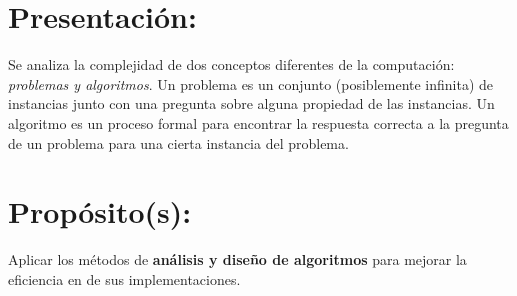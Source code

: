 \section{Presentaci\'{o}n:}

Se analiza la complejidad de dos conceptos diferentes de la
computaci\'{o}n: {\em problemas y algoritmos}. Un problema es un
conjunto (posiblemente infinita) de instancias junto con una pregunta
sobre alguna propiedad de las instancias.  Un algoritmo es un proceso
formal para encontrar la respuesta correcta a la pregunta de un
problema para una cierta instancia del problema.
  
\section{Prop\'{o}sito(s):}

Aplicar los m\'{e}todos de {\bf an\'{a}lisis y dise\~{n}o de
  algoritmos} para mejorar la eficiencia en de sus implementaciones.
